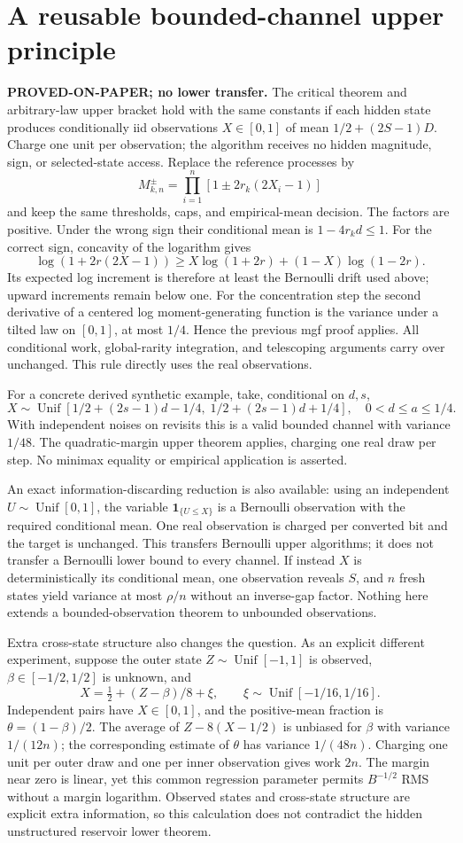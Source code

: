 \section{A reusable bounded-channel upper principle}
\noindent\textbf{PROVED-ON-PAPER; no lower transfer.}
The critical theorem and arbitrary-law upper bracket hold with the same
constants if each hidden state produces conditionally iid observations
$X\in[0,1]$ of mean $1/2+(2S-1)D$. Charge one unit per observation; the
algorithm receives no hidden magnitude, sign, or selected-state access.
Replace the reference processes by
\[
 M^\pm_{k,n}=\prod_{i=1}^n[1\pm2r_k(2X_i-1)]
\]
and keep the same thresholds, caps, and empirical-mean decision. The factors
are positive. Under the wrong sign their conditional mean is $1-4r_kd\le1$.
For the correct sign, concavity of the logarithm gives
\[
 \log(1+2r(2X-1))\ge
 X\log(1+2r)+(1-X)\log(1-2r).
\]
Its expected log increment is therefore at least the Bernoulli drift used
above; upward increments remain below one. For the concentration step the
second derivative of a centered log moment-generating function is the variance
under a tilted law on $[0,1]$, at most $1/4$. Hence the previous mgf proof
applies. All conditional work, global-rarity integration, and telescoping
arguments carry over unchanged. This rule directly uses the real observations.

For a concrete derived synthetic example, take, conditional on $d,s$,
\[
 X\sim\operatorname{Unif}
 [1/2+(2s-1)d-1/4,\;1/2+(2s-1)d+1/4],
 \quad 0<d\le a\le1/4.
\]
With independent noises on revisits this is a valid bounded channel with
variance $1/48$. The quadratic-margin upper theorem applies, charging one
real draw per step. No minimax equality or empirical application is asserted.

An exact information-discarding reduction is also available: using an
independent $U\sim\operatorname{Unif}[0,1]$, the variable
$\mathbf1_{\{U\le X\}}$ is a Bernoulli observation with the required
conditional mean. One real observation is charged per converted bit and the
target is unchanged. This transfers Bernoulli upper algorithms; it does not
transfer a Bernoulli lower bound to every channel. If instead $X$ is
deterministically its conditional mean, one observation reveals $S$, and $n$
fresh states yield variance at most $\rho/n$ without an inverse-gap factor.
Nothing here extends a bounded-observation theorem to unbounded observations.

Extra cross-state structure also changes the question. As an explicit
different experiment, suppose the outer state $Z\sim\operatorname{Unif}[-1,1]$
is observed, $\beta\in[-1/2,1/2]$ is unknown, and
\[
 X=\tfrac12+(Z-\beta)/8+\xi,\qquad
 \xi\sim\operatorname{Unif}[-1/16,1/16].
\]
Independent pairs have $X\in[0,1]$, and the positive-mean fraction is
$\theta=(1-\beta)/2$. The average of $Z-8(X-1/2)$ is unbiased for $\beta$
with variance $1/(12n)$; the corresponding estimate of $\theta$ has variance
$1/(48n)$. Charging one unit per outer draw and one per inner observation
gives work $2n$. The margin near zero is linear, yet this common regression
parameter permits $B^{-1/2}$ RMS without a margin logarithm. Observed states
and cross-state structure are explicit extra information, so this calculation
does not contradict the hidden unstructured reservoir lower theorem.
